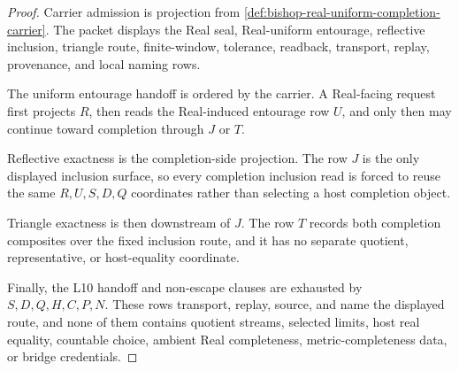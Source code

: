\begin{proof}
Carrier admission is projection from \autoref{def:bishop-real-uniform-completion-carrier}. The packet displays the Real seal, Real-uniform entourage, reflective inclusion, triangle route, finite-window, tolerance, readback, transport, replay, provenance, and local naming rows.

The uniform entourage handoff is ordered by the carrier. A Real-facing request first projects $R$, then reads the Real-induced entourage row $U$, and only then may continue toward completion through $J$ or $T$.

Reflective exactness is the completion-side projection. The row $J$ is the only displayed inclusion surface, so every completion inclusion read is forced to reuse the same $R,U,S,D,Q$ coordinates rather than selecting a host completion object.

Triangle exactness is then downstream of $J$. The row $T$ records both completion composites over the fixed inclusion route, and it has no separate quotient, representative, or host-equality coordinate.

Finally, the L10 handoff and non-escape clauses are exhausted by $S,D,Q,H,C,P,N$. These rows transport, replay, source, and name the displayed route, and none of them contains quotient streams, selected limits, host real equality, countable choice, ambient Real completeness, metric-completeness data, or bridge credentials.
\end{proof}

